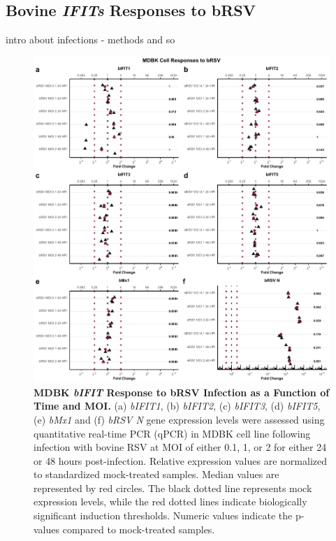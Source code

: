 \subsection{Bovine \textit{IFITs} Responses to bRSV} \label{subsec:Bovine IFITs Responses to bRSV}

intro about infections - methods and so


\begin{figure}
    \centering
    \includegraphics[width=1\linewidth]{07. Chapter 2/Figs/02. Induction/03. mdbk_brsv_timepoints.pdf}
    \caption[MDBK \textit{bIFIT} Response to bRSV Infection as a Function of Time and MOI.]{\textbf{MDBK \textit{bIFIT} Response to bRSV Infection as a Function of Time and MOI.} (a) \textit{bIFIT1}, (b) \textit{bIFIT2}, (c) \textit{bIFIT3}, (d) \textit{bIFIT5}, (e) \textit{bMx1} and (f) \textit{bRSV N} gene expression levels were assessed using quantitative real-time PCR (qPCR) in MDBK cell line following infection with bovine RSV at MOI of either 0.1, 1, or 2 for either 24 or 48 hours post-infection. Relative expression values are normalized to standardized mock-treated samples. Median values are represented by red circles. The black dotted line represents mock expression levels, while the red dotted lines indicate biologically significant induction thresholds. Numeric values indicate the p-values compared to mock-treated samples.}
    \label{fig:MDBK responses to bRSV timepoints}
\end{figure}


